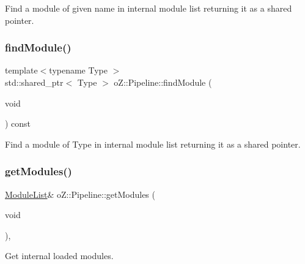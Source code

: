Find a module of given name in internal module list returning it as a shared pointer. 

\mbox{\label{classo_z_1_1_pipeline_a4f1abc0f7c0985dbc859cd5b20082998}} 
\subsubsection{\texorpdfstring{findModule()}{findModule()}\hspace{0.1cm}{\footnotesize\ttfamily [2/2]}}
{\footnotesize\ttfamily template$<$typename Type $>$ \\
std\+::shared\+\_\+ptr$<$ Type $>$ o\+Z\+::\+Pipeline\+::find\+Module (\begin{DoxyParamCaption}\item[{void}]{ }\end{DoxyParamCaption}) const}



Find a module of Type in internal module list returning it as a shared pointer. 

\mbox{\label{classo_z_1_1_pipeline_a3886c29b903d2e359a853ea76711661b}} 
\subsubsection{\texorpdfstring{getModules()}{getModules()}\hspace{0.1cm}{\footnotesize\ttfamily [1/2]}}
{\footnotesize\ttfamily \mbox{\hyperlink{classo_z_1_1_pipeline_a3bb478d291a83763b269d8d27e186a47}{Module\+List}}\& o\+Z\+::\+Pipeline\+::get\+Modules (\begin{DoxyParamCaption}\item[{void}]{ }\end{DoxyParamCaption})\hspace{0.3cm}{\ttfamily [inline]}, {\ttfamily [noexcept]}}



Get internal loaded modules. 

\mbox{\label{classo_z_1_1_pipeline_a84358c4166a67aabc0d5811608727da9}} 
